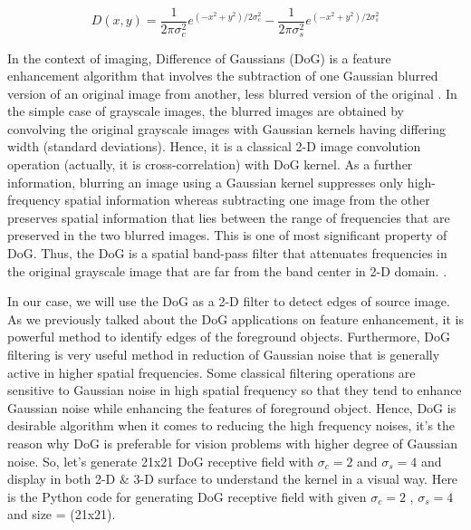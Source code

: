 \documentclass[12pt]{amsart}
\begin{document}
\begin{equation}
    D(x,y) = \frac{1}{2 \pi \sigma_c^2} e^{(-x^2 + y^2)/2 \sigma_c^2} - \frac{1}{2 \pi \sigma_s^2} e^{(-x^2 + y^2)/2 \sigma_s^2}
\end{equation}


\vspace{2mm}

In the context of imaging, Difference of Gaussians (DoG) is a feature enhancement algorithm that involves the subtraction of one Gaussian blurred version of an original image from another, less blurred version of the original \cite{enwiki:1007271206}. In the simple case of grayscale images, the blurred images are obtained by convolving the original grayscale images with Gaussian kernels having differing width (standard deviations)\cite{enwiki:1007271206}. Hence, it is a classical 2-D image convolution operation (actually, it is cross-correlation) with DoG kernel. As a further information, blurring an image using a Gaussian kernel suppresses only high-frequency spatial information whereas subtracting one image from the other preserves spatial information that lies between the range of frequencies that are preserved in the two blurred images\cite{enwiki:1007271206}. This is one of most significant property of DoG. Thus, the DoG is a spatial band-pass filter that attenuates frequencies in the original grayscale image that are far from the band center in 2-D domain. \cite{enwiki:1007271206}.

\bigskip

In our case, we will use the DoG as a 2-D filter to detect edges of source image. As we previously talked about the DoG applications on feature enhancement, it is powerful method to identify edges of the foreground objects. Furthermore, DoG filtering is very useful method in reduction of Gaussian noise that is generally active in higher spatial frequencies. Some classical filtering operations are sensitive to Gaussian noise in high spatial frequency so that they tend to enhance Gaussian noise while enhancing the features of foreground object. Hence, DoG is desirable algorithm when it comes to reducing the high frequency noises, it's the reason why DoG is preferable for vision problems with higher degree of Gaussian noise. So, let's generate 21x21 DoG receptive field with $\sigma_c = 2$ and $\sigma_s = 4$ and display in both 2-D \& 3-D surface to understand the kernel in a visual way. Here is the Python code for generating DoG receptive field with given $\sigma_c = 2$ , $\sigma_s = 4$ and size = (21x21).
\end{document}

